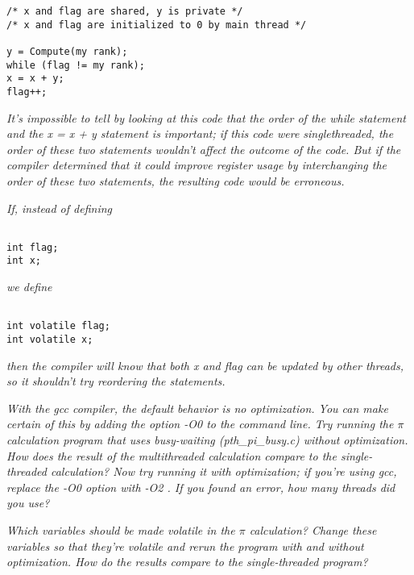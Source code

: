 \documentclass{article}
\begin{document}
\lstset{language=C,
	xleftmargin=16pt,
        framextopmargin=6pt,
        framexbottommargin=6pt, 
        frame=tb, framerule=0pt,}

\begin{lstlisting}
/* x and flag are shared, y is private */
/* x and flag are initialized to 0 by main thread */

y = Compute(my rank);
while (flag != my rank);
x = x + y;
flag++;
\end{lstlisting}

\noindent \emph
{
	It’s impossible to tell by looking at this code that the order of the while
	statement and the {\emph{x = x + y}} statement is important; if this code were 
	singlethreaded, the order of these two statements wouldn’t affect the outcome of the
	code. But if the compiler determined that it could improve register usage by
	interchanging the order of these two statements, the resulting code would be
	erroneous.
}

\emph
{
	If, instead of defining
}

\begin{lstlisting}

int flag;
int x;

\end{lstlisting}

\noindent \emph
{
	we define
}

\begin{lstlisting}

int volatile flag;
int volatile x;

\end{lstlisting}

\noindent \emph
{
	then the compiler will know that both {\emph{x}} and {\emph{flag}} can be updated by other
	threads, so it shouldn’t try reordering the statements.
}

\emph
{
	With the {\emph{gcc}} compiler, the default behavior is no optimization. You can
	make certain of this by adding the option {\emph{-O0}} to the command line. Try
	running the $\pi$ calculation program that uses busy-waiting {\emph{(pth\_pi\_busy.c)}}
	without optimization. How does the result of the multithreaded calculation
	compare to the single-threaded calculation? Now try running it with optimization;
	if you’re using {\emph{gcc}}, replace the {\emph{-O0}} option with {\emph{-O2}} . If you found an
	error, how many threads did you use?
}

\emph
{
	Which variables should be made volatile in the $\pi$ calculation? Change
	these variables so that they’re volatile and rerun the program with and without
	optimization. How do the results compare to the single-threaded program?
}
\end{document}
